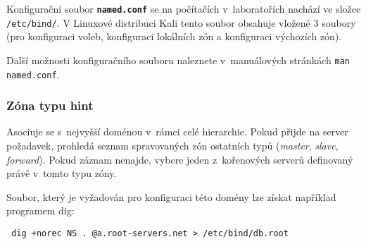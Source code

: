 Konfigurační soubor {\tt\bf named.conf} se na počítačích v~laboratořích nachází ve složce {\tt
/etc/bind/}. V Linuxové distribuci Kali tento soubor obsahuje vložené 3 soubory (pro konfiguraci voleb,
konfiguraci lokálních zón a konfiguraci výchozích zón).

%
%
%
%
%
%
%
%
%

Další možnosti konfiguračního souboru naleznete v~manuálových stránkách {\tt man named.conf}.

\subsubsection{Zóna typu hint}
Asociuje se s~nejvyšší doménou v~rámci celé hierarchie. Pokud přijde na server požadavek, prohledá seznam spravovaných zón ostatních typů ({\em master}, {\em slave}, {\em forward}). Pokud záznam nenajde, vybere jeden z~kořenových serverů definovaný právě v~tomto typu zóny.

Soubor, který je vyžadován pro konfiguraci této domény lze získat například programem dig:
\begin{verbatim}
 dig +norec NS . @a.root-servers.net > /etc/bind/db.root
\end{verbatim}

